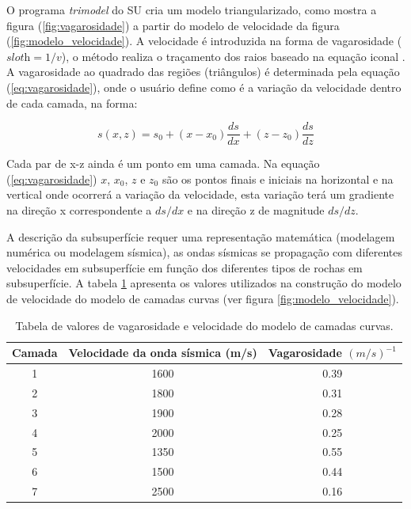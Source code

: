 O programa \textit{trimodel} do SU cria um modelo triangularizado, como mostra a figura (\ref{fig:vagarosidade}) a partir do modelo de velocidade da figura (\ref{fig:modelo_velocidade}). 
A velocidade é introduzida na forma de vagarosidade ($\textit{sloth}=1/v$), o método realiza o traçamento dos raios baseado na equação iconal \citep{Forel(2005)}. A vagarosidade ao quadrado das regiões (triângulos) é determinada pela equação (\ref{eq:vagarosidade}), onde o usuário define como é a variação da velocidade dentro de cada camada, na forma:

\begin{equation}
s(x,z)=s_{0}+\left(x-x_{0}\right) \frac{ds}{dx}+\left(z-z_{0}\right) \frac{ds}{dz}
\label{eq:vagarosidade}
\end{equation}

Cada par de x-z ainda é um ponto em uma camada. Na equação (\ref{eq:vagarosidade}) $x$, $x_0$, $z$ e $z_0$ são os pontos finais e iniciais na horizontal e na vertical onde ocorrerá a variação da velocidade, esta variação terá um gradiente na direção x correspondente a $ds/dx$ e na direção z de magnitude $ds/dz$.

A descrição da subsuperfície requer uma representação matemática (modelagem numérica ou modelagem sísmica), as ondas sísmicas se propagação com diferentes velocidades em subsuperfície em função dos diferentes tipos de rochas em subsuperfície. A tabela \ref{tab:tab1} apresenta os valores utilizados na construção do modelo de velocidade do modelo de camadas curvas (ver figura \ref{fig:modelo_velocidade}).

\begin{table}[H]
\centering
\begin{tabular}{|c|c|c|}
\hline
Camada & Velocidade da onda sísmica (m/s) & Vagarosidade $(m/s)^{-1}$ \\ \hline
1 & 1600 & 0.39 \\ \hline
2 & 1800 & 0.31 \\ \hline
3 & 1900 & 0.28 \\ \hline
4 & 2000 & 0.25 \\ \hline
5 & 1350 & 0.55 \\ \hline
6 & 1500 & 0.44 \\ \hline
7 & 2500 & 0.16 \\ \hline
\end{tabular}
\caption{Tabela de valores de vagarosidade e velocidade do modelo de camadas curvas.}
\label{tab:tab1}
\end{table}

